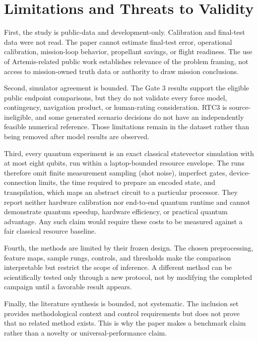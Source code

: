 \section{Limitations and Threats to Validity}
\label{sec:limitations}

First, the study is public-data and development-only. Calibration and
final-test data were not read. The paper cannot estimate final-test error,
operational calibration, mission-loop behavior, propellant savings, or flight
readiness. The use of Artemis-related public work establishes relevance of the
problem framing, not access to mission-owned truth data or authority to draw
mission conclusions.

Second, simulator agreement is bounded. The Gate 3 results support the
eligible public endpoint comparisons, but they do not validate every force
model, contingency, navigation product, or human-rating consideration. RTC3
is source-ineligible, and some generated scenario decisions do not have an
independently feasible numerical reference. Those limitations remain in the
dataset rather than being removed after model results are observed.

Third, every quantum experiment is an exact classical statevector simulation
with at most eight qubits, run within a laptop-bounded resource envelope. The
runs therefore omit finite measurement sampling (shot noise), imperfect gates,
device-connection limits, the time required to prepare an encoded state, and
transpilation, which maps an abstract circuit to a particular processor. They
report neither hardware calibration nor end-to-end quantum runtime and cannot
demonstrate quantum speedup, hardware efficiency, or practical quantum
advantage. Any such claim would require these costs to be measured against a
fair classical resource baseline.

Fourth, the methods are limited by their frozen design. The chosen
preprocessing, feature maps, sample rungs, controls, and thresholds make the
comparison interpretable but restrict the scope of inference. A different
method can be scientifically tested only through a new protocol, not by
modifying the completed campaign until a favorable result appears.

Finally, the literature synthesis is bounded, not systematic. The inclusion
set provides methodological context and control requirements but does not
prove that no related method exists. This is why the paper makes a benchmark
claim rather than a novelty or universal-performance claim.

